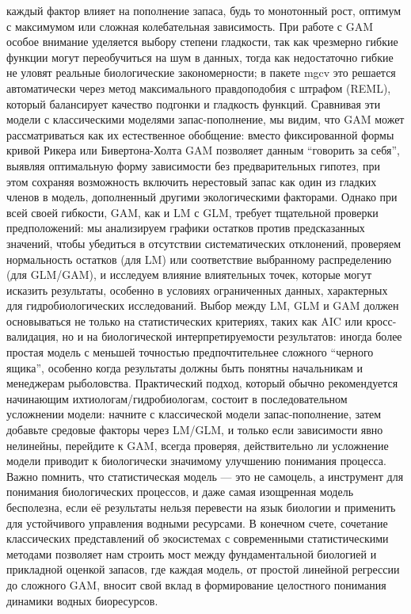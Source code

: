 \documentclass[
  letterpaper,
  DIV=11,
  numbers=noendperiod]{scrreprt}
\begin{document}
каждый фактор влияет на пополнение запаса, будь то монотонный рост,
оптимум с максимумом или сложная колебательная зависимость. При работе с
GAM особое внимание уделяется выбору степени гладкости, так как
чрезмерно гибкие функции могут переобучиться на шум в данных, тогда как
недостаточно гибкие не уловят реальные биологические закономерности; в
пакете mgcv это решается автоматически через метод максимального
правдоподобия с штрафом (REML), который балансирует качество подгонки и
гладкость функций. Сравнивая эти модели с классическими моделями
запас-пополнение, мы видим, что GAM может рассматриваться как их
естественное обобщение: вместо фиксированной формы кривой Рикера или
Бивертона-Холта GAM позволяет данным ``говорить за себя'', выявляя
оптимальную форму зависимости без предварительных гипотез, при этом
сохраняя возможность включить нерестовый запас как один из гладких
членов в модель, дополненный другими экологическими факторами. Однако
при всей своей гибкости, GAM, как и LM с GLM, требует тщательной
проверки предположений: мы анализируем графики остатков против
предсказанных значений, чтобы убедиться в отсутствии систематических
отклонений, проверяем нормальность остатков (для LM) или соответствие
выбранному распределению (для GLM/GAM), и исследуем влияние влиятельных
точек, которые могут исказить результаты, особенно в условиях
ограниченных данных, характерных для гидробиологических исследований.
Выбор между LM, GLM и GAM должен основываться не только на
статистических критериях, таких как AIC или кросс-валидация, но и на
биологической интерпретируемости результатов: иногда более простая
модель с меньшей точностью предпочтительнее сложного ``черного ящика'',
особенно когда результаты должны быть понятны начальникам и менеджерам
рыболовства. Практический подход, который обычно рекомендуется
начинающим ихтиологам/гидробиологам, состоит в последовательном
усложнении модели: начните с классической модели запас-пополнение, затем
добавьте средовые факторы через LM/GLM, и только если зависимости явно
нелинейны, перейдите к GAM, всегда проверяя, действительно ли усложнение
модели приводит к биологически значимому улучшению понимания процесса.
Важно помнить, что статистическая модель --- это не самоцель, а
инструмент для понимания биологических процессов, и даже самая
изощренная модель бесполезна, если её результаты нельзя перевести на
язык биологии и применить для устойчивого управления водными ресурсами.
В конечном счете, сочетание классических представлений об экосистемах с
современными статистическими методами позволяет нам строить мост между
фундаментальной биологией и прикладной оценкой запасов, где каждая
модель, от простой линейной регрессии до сложного GAM, вносит свой вклад
в формирование целостного понимания динамики водных биоресурсов.
\end{document}

